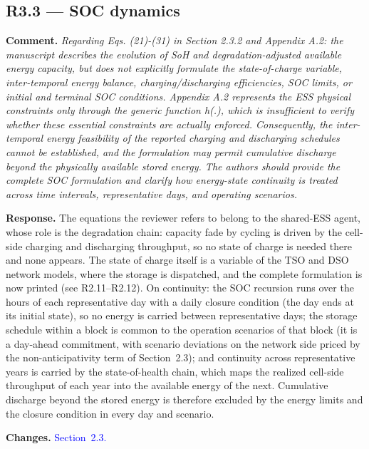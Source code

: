 \documentclass[11pt]{article}
\newcommand{\rcomment}[1]{\par\medskip\noindent\textbf{Comment.} \textit{#1}\par\smallskip}
\newcommand{\rresponse}[1]{\noindent\textbf{Response.} #1\par\smallskip}
\newcommand{\rchanges}[1]{\noindent\textbf{Changes.} \textcolor{blue}{#1}\par\medskip}
\begin{document}
\subsection*{R3.3 --- SOC dynamics}
\rcomment{
Regarding Eqs. (21)-(31) in Section 2.3.2 and Appendix A.2: the manuscript describes the evolution of SoH and degradation-adjusted available energy capacity, but does not explicitly formulate the state-of-charge variable, inter-temporal energy balance, charging/discharging efficiencies, SOC limits, or initial and terminal SOC conditions. Appendix A.2 represents the ESS physical constraints only through the generic function h(.), which is insufficient to verify whether these essential constraints are actually enforced. Consequently, the inter-temporal energy feasibility of the reported charging and discharging schedules cannot be established, and the formulation may permit cumulative discharge beyond the physically available stored energy. The authors should provide the complete SOC formulation and clarify how energy-state continuity is treated across time intervals, representative days, and operating scenarios.
}
\rresponse{The equations the reviewer refers to belong to the shared-ESS agent, whose role is the
degradation chain: capacity fade by cycling is driven by the cell-side charging and discharging
throughput, so no state of charge is needed there and none appears. The state of charge itself is a
variable of the TSO and DSO network models, where the storage is dispatched, and the complete formulation
is now printed (see R2.11--R2.12). On continuity: the SOC recursion runs over the hours of each
representative day with a daily closure condition (the day ends at its initial state), so no energy is
carried between representative days; the storage schedule within a block is common to the operation
scenarios of that block (it is a day-ahead commitment, with scenario deviations on the network side
priced by the non-anticipativity term of Section~2.3); and continuity across representative years is
carried by the state-of-health chain, which maps the realized cell-side throughput of each year into the
available energy of the next. Cumulative discharge beyond the stored energy is therefore excluded by the
energy limits and the closure condition in every day and scenario.}
\rchanges{Section~2.3.}
\end{document}
